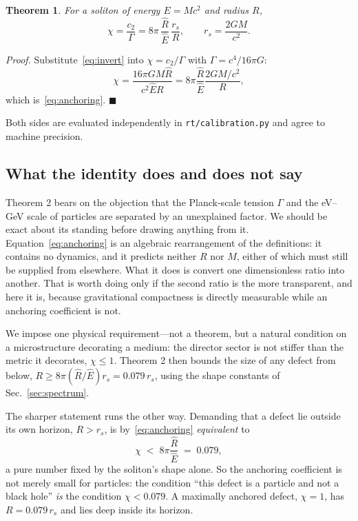 \documentclass[aps,prd,preprint,nofootinbib,longbibliography]{revtex4-2}
\newtheorem{theorem}{Theorem}
\newcommand{\qed}{\hfill$\blacksquare$}
\newcommand{\Ehat}{\hat{E}}
\newcommand{\Rhat}{\hat{R}}
\begin{document}
\begin{theorem}
For a soliton of energy $E=Mc^2$ and radius $R$,
\begin{equation}
\chi=\frac{c_2}{\Gamma}=8\pi\,\frac{\Rhat}{\Ehat}\,\frac{r_s}{R},
\qquad r_s=\frac{2GM}{c^2}.
\label{eq:anchoring}
\end{equation}
\end{theorem}

\textit{Proof.} Substitute~\eqref{eq:invert} into $\chi=c_2/\Gamma$ with
$\Gamma=c^4/16\pi G$:
\[
\chi=\frac{16\pi G M\Rhat}{c^2\Ehat R}
   =8\pi\frac{\Rhat}{\Ehat}\frac{2GM/c^2}{R},
\]
which is~\eqref{eq:anchoring}. \qed

Both sides are evaluated independently in \texttt{rt/calibration.py} and agree to
machine precision.

\subsection{What the identity does and does not say}

Theorem 2 bears on the objection that the Planck-scale tension $\Gamma$ and the
eV--GeV scale of particles are separated by an unexplained factor. We should be
exact about its standing before drawing anything from it. Equation~\eqref{eq:anchoring}
is an algebraic rearrangement of the definitions: it contains no dynamics, and it
predicts neither $R$ nor $M$, either of which must still be supplied from
elsewhere. What it does is convert one dimensionless ratio into another. That is
worth doing only if the second ratio is the more transparent, and here it is,
because gravitational compactness is directly measurable while an anchoring
coefficient is not.

We impose one physical requirement---not a theorem, but a natural condition on a
microstructure decorating a medium: the director sector is not stiffer than the
metric it decorates, $\chi\le1$. Theorem 2 then bounds the size of any defect
from below, $R\ge8\pi(\Rhat/\Ehat)r_s=0.079\,r_s$, using the shape constants of
Sec.~\ref{sec:spectrum}.

The sharper statement runs the other way. Demanding that a defect lie outside its
own horizon, $R>r_s$, is by~\eqref{eq:anchoring} \emph{equivalent} to
\begin{equation}
\chi \;<\; 8\pi\frac{\Rhat}{\Ehat} \;=\; 0.079 ,
\label{eq:notbh}
\end{equation}
a pure number fixed by the soliton's shape alone. So the anchoring coefficient is
not merely small for particles: the condition ``this defect is a particle and not
a black hole'' \emph{is} the condition $\chi<0.079$. A maximally anchored defect,
$\chi=1$, has $R=0.079\,r_s$ and lies deep inside its horizon.
\end{document}
